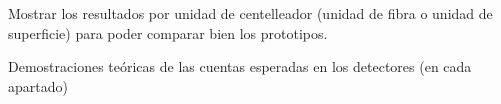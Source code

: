 Mostrar los resultados por unidad de centelleador (unidad de fibra o unidad de superficie) para poder comparar bien los prototipos.

Demostraciones teóricas de las cuentas esperadas en los detectores (en cada apartado)